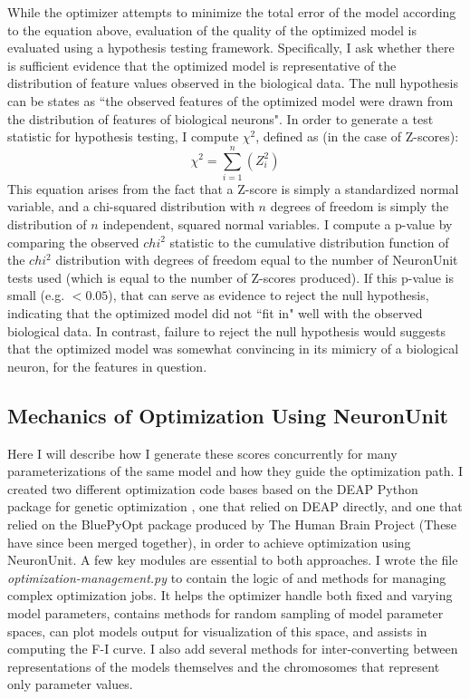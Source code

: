 While the optimizer attempts to minimize the total error of the model according to the equation above, evaluation of the quality of the optimized model is evaluated using a hypothesis testing framework.
Specifically, I ask whether there is sufficient evidence that the optimized model is representative of the distribution of feature values observed in the biological data.
The null hypothesis can be states as ``the observed features of the optimized model were drawn from the distribution of features of biological neurons".
In order to generate a test statistic for hypothesis testing, I compute $\chi^{2}$, defined as (in the case of Z-scores):
\begin{equation}
\chi^{2}=\sum\limits_{i=1}^{n}(Z_{i}^{2})
\end{equation}
This equation arises from the fact that a Z-score is simply a standardized normal variable, and a chi-squared distribution with $n$ degrees of freedom is simply the distribution of $n$ independent, squared normal variables.
I compute a p-value by comparing the observed $chi^2$ statistic to the cumulative distribution function of the $chi^2$ distribution with degrees of freedom equal to the number of NeuronUnit tests used (which is equal to the number of Z-scores produced).
If this p-value is small (e.g. $<0.05$), that can serve as evidence to reject the null hypothesis, indicating that the optimized model did not ``fit in" well with the observed biological data.
In contrast, failure to reject the null hypothesis would suggests that the optimized model was somewhat convincing in its mimicry of a biological neuron, for the features in question.

\subsection{Mechanics of Optimization Using NeuronUnit}
Here I will describe how I generate these scores concurrently for many parameterizations of the same model and how they guide the optimization path.
I created two different optimization code bases based on the DEAP Python package for genetic optimization \citep{DEAP_JMLR2012}, one that relied on DEAP directly, and one that relied on the BluePyOpt package produced by The Human Brain Project \citep{bluepyopt} (These have since been merged together), in order to achieve optimization using NeuronUnit.
A few key modules are essential to both approaches.
I wrote the file \emph{optimization-management.py} to contain the logic of and methods for managing complex optimization jobs.
It helps the optimizer handle both fixed and varying  model parameters, contains methods for random sampling of model parameter spaces, can plot models output for visualization of this space, and assists in computing the F-I curve.
I also add several methods for inter-converting between representations of the models themselves and the chromosomes that represent only parameter values.


